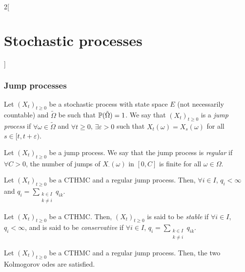 \documentclass[../../../main_math.tex]{subfiles}
\begin{document}
\begin{multicols}{2}[\section{Stochastic processes}]
  \subsubsection{Jump processes}
  \begin{definition}
    Let ${(X_t)}_{t\geq 0}$ be a stochastic process with state space $E$ (not necessarily countable) and $\tilde\Omega$ be such that $\mathbb{P}(\tilde{\Omega})=1$. We say that ${(X_t)}_{t\geq 0}$ is a \emph{jump process} if $\forall \omega \in \tilde{\Omega}$ and $\forall t\geq 0$, $\exists \varepsilon>0$ such that $X_t(\omega)=X_{s}(\omega)$ for all $s\in[t,t+\varepsilon)$.
  \end{definition}
  \begin{definition}
    Let ${(X_t)}_{t\geq 0}$ be a jump process. We say that the jump process is \emph{regular} if $\forall C>0$, the number of jumps of $X_{\cdot}(\omega)$ in $[0,C]$ is finite for all $\omega\in\Omega$.
  \end{definition}
  \begin{theorem}
    Let ${(X_t)}_{t\geq 0}$ be a CTHMC and a regular jump process. Then, $\forall i\in I$, $q_i<\infty$ and $q_i=\sum_{\substack{k\in I\\k\ne i}}q_{ik}$.
  \end{theorem}
  \begin{definition}
    Let ${(X_t)}_{t\geq 0}$ be a CTHMC. Then, ${(X_t)}_{t\geq 0}$ is said to be \emph{stable} if $\forall i\in I$, $q_i<\infty$, and is said to be \emph{conservative} if $\forall i\in I$, $q_i=\sum_{\substack{k\in I\\k\ne i}}q_{ik}$.
  \end{definition}
  \begin{theorem}
    Let ${(X_t)}_{t\geq 0}$ be a CTHMC and a regular jump process. Then, the two Kolmogorov odes are satisfied.
  \end{theorem}

\end{multicols}
\end{document}
